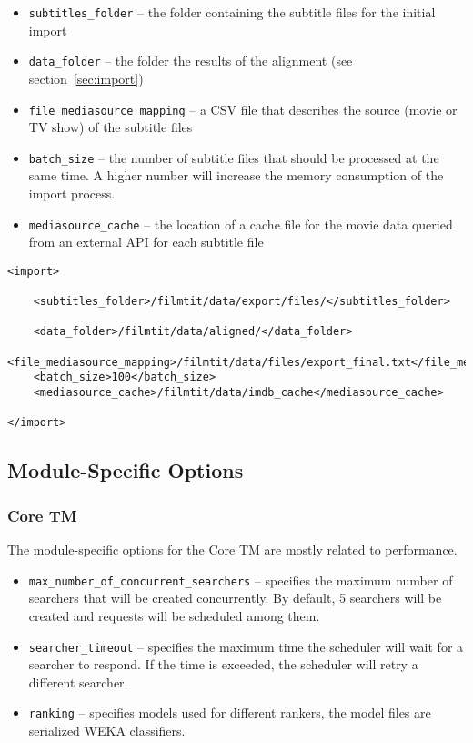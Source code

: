 \begin{itemize}
        \item \verb#subtitles_folder# -- the folder containing the subtitle files for the initial import
        \item \verb#data_folder# -- the folder the results of the alignment (see section~\ref{sec:import})
        \item \verb#file_mediasource_mapping# -- a CSV file that describes the source (movie or TV show) of the  subtitle files
        \item \verb#batch_size# -- the number of subtitle files that should be processed at the same time. A higher number will increase the memory consumption of the import process.
        \item \verb#mediasource_cache# -- the location of a cache file for the movie data queried from an external API for each subtitle file
        
\end{itemize}


\begin{lstlisting}
<import>

    <subtitles_folder>/filmtit/data/export/files/</subtitles_folder>

    <data_folder>/filmtit/data/aligned/</data_folder>
    <file_mediasource_mapping>/filmtit/data/files/export_final.txt</file_mediasource_mapping>
    <batch_size>100</batch_size>
    <mediasource_cache>/filmtit/data/imdb_cache</mediasource_cache>

</import>
\end{lstlisting}


\subsection{Module-Specific Options}

\subsubsection{Core TM}

The module-specific options for the Core TM are mostly related to performance.

\begin{itemize}
        \item \verb#max_number_of_concurrent_searchers# -- specifies the maximum number of searchers that will be created concurrently. By default, 5 searchers will be created and requests will be scheduled among them.
        \item \verb#searcher_timeout# -- specifies the maximum time the scheduler will wait for a searcher to respond. If the time is exceeded, the scheduler will retry a different searcher.
        \item \verb#ranking# -- specifies models used for different rankers, the model files are serialized WEKA classifiers.

\end{itemize}


